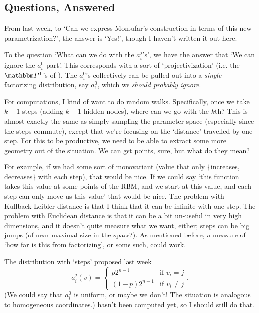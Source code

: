 \documentclass[12pt]{article}
\begin{document}
\subsection{Questions, Answered}

From last week, to `Can we express Montufar's construction in terms of this new
parametrization?', the answer is `Yes!', though I haven't written it out here.

To the question `What can we do with the $a_i^j$'s', we have the answer that `We
can ignore the $a_i^0$ part'.  This corresponds with a sort of
`projectivization' (i.e. the $\Proj^1$'s of \cite{CMS09}).  The $a_i^0$'s
collectively can be pulled out into a \textit{single} factorizing distribution,
say $a_1^0$, which we \textit{should probably ignore}.

For computations, I kind of want to do random walks.  Specifically, once we take
$k-1$ steps (adding $k-1$ hidden nodes), where can we go with the $k$th?  This
is almost exactly the same as simply sampling the parameter space (especially
since the steps commute), except that we're focusing on the `distance' travelled
by one step.  For this to be productive, we need to be able to extract some more
geometry out of the situation.  We can get points, sure, but what do they mean?

For example, if we had some sort of monovariant (value that only
\{increases, decreases\} with each step), that would be nice.  If we could say
`this function takes this value at some points of the RBM, and we start at this
value, and each step can only move us this value' that would be nice.  The
problem with Kullback-Leibler distance is that I think that it can be infinite
with one step.  The problem with Euclidean distance is that it can be a bit
un-useful in very high dimensions, and it doesn't quite measure what we want,
either; steps can be big jumps (of near maximal size in the space?).  As
mentioned before, a measure of `how far is this from factorizing', or some such,
could work.

The distribution with `steps' proposed last week
\[
    a_i^j(v) = \begin{cases}
        p 2^{n-1} & \text{if $v_i = j$}\\
        (1 - p) 2^{n-1}  & \text{if $v_i \ne j$}
    \end{cases}.
\]
(We could say that $a_i^0$ is uniform, or maybe we don't!  The situation is
analogous to homogeneous coordinates.)  hasn't been computed yet, so I should
still do that.
\end{document}
